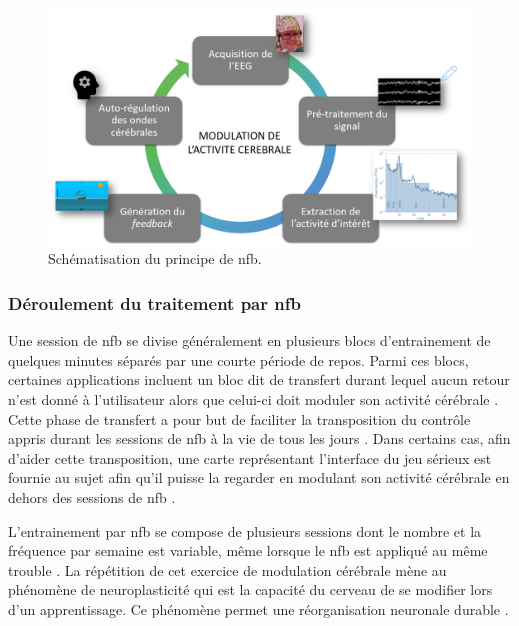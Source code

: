\begin{figure}[h!]
  \centering
	\includegraphics[width=1\linewidth]{figures/chapter-1/introduction-nfb-explication} 
  \caption[Schématisation du principe de \gls{nfb}.]{Schématisation du principe de \gls{nfb}.}
  \label{Figure:introduction_nfb_explications}
\end{figure}

\subsubsection{Déroulement du traitement par \gls{nfb}}

Une session de \gls{nfb} se divise généralement en plusieurs blocs d'entrainement de quelques minutes séparés par une courte période de repos.
Parmi ces blocs, certaines applications incluent 
un bloc dit de transfert durant lequel aucun retour n'est donné à l'utilisateur alors que celui-ci doit moduler son activité cérébrale \citep{Bioulac2019,
Bluschke2016, Gani2008, Strehl2006}. Cette phase de transfert a pour but de faciliter la transposition du contrôle appris durant les 
sessions de \gls{nfb} à la vie de tous les jours \citep{Arns2014}. Dans certains cas, afin d'aider cette transposition, une carte représentant l'interface du jeu sérieux est 
fournie au sujet afin qu'il puisse la regarder en modulant son activité cérébrale en dehors des sessions de \gls{nfb} \citep{Leins2007}.

L'entrainement par \gls{nfb} se compose de plusieurs sessions dont le nombre et la fréquence par semaine est variable, même lorsque le \gls{nfb} est appliqué au même trouble 
\citep{Enriquez2017}. La répétition de cet exercice de modulation cérébrale mène au phénomène de 
neuroplasticité \citep{VanDoren2017, Ros2010} qui est la capacité du cerveau de se modifier lors d'un apprentissage. Ce phénomène 
permet une réorganisation neuronale durable \citep{VanDoren2017}. 

